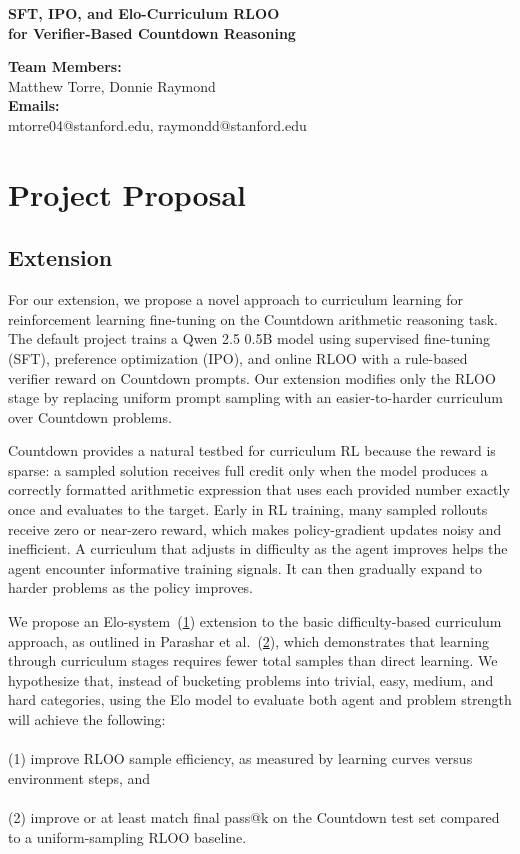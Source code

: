 \documentclass[11pt]{article}
\makeatletter
\renewcommand{\maketitle}{
  \begin{center}
    {\bf \large
SFT, IPO, and Elo-Curriculum RLOO\\for Verifier-Based Countdown Reasoning
    }
    \vspace{0.2cm}

    {\bf Team Members:}\\
    Matthew Torre, Donnie Raymond\\[0.1cm]

    {\bf Emails:}\\
    mtorre04@stanford.edu, raymondd@stanford.edu
  \end{center}
}
\makeatother
\begin{document}
\maketitle

\section{Project Proposal}

\subsection{Extension}

For our extension, we propose a novel approach to curriculum learning for reinforcement learning fine-tuning on the Countdown arithmetic reasoning task. The default project trains a Qwen 2.5 0.5B model using supervised fine-tuning (SFT), preference optimization (IPO), and online RLOO with a rule-based verifier reward on Countdown prompts. Our extension modifies only the RLOO stage by replacing uniform prompt sampling with an easier-to-harder curriculum over Countdown problems.

Countdown provides a natural testbed for curriculum RL because the reward is sparse: a sampled solution receives full credit only when the model produces a correctly formatted arithmetic expression that uses each provided number exactly once and evaluates to the target. Early in RL training, many sampled rollouts receive zero or near-zero reward, which makes policy-gradient updates noisy and inefficient. A curriculum that adjusts in difficulty as the agent improves helps the agent encounter informative training signals. It can then gradually expand to harder problems as the policy improves.

We propose an Elo-system~(\hyperlink{elo}{1}) extension to the basic difficulty-based curriculum approach, as outlined in Parashar et al.~(\hyperlink{paper:curriculum_sampling}{2}), which demonstrates that learning through curriculum stages requires fewer total samples than direct learning. We hypothesize that, instead of bucketing problems into trivial, easy, medium, and hard categories, using the Elo model to evaluate both agent and problem strength will achieve the following: \\ \\
(1) improve RLOO sample efficiency, as measured by learning curves versus environment steps, and \\ \\
(2) improve or at least match final pass@k on the Countdown test set compared to a uniform-sampling RLOO baseline. 
\end{document}
